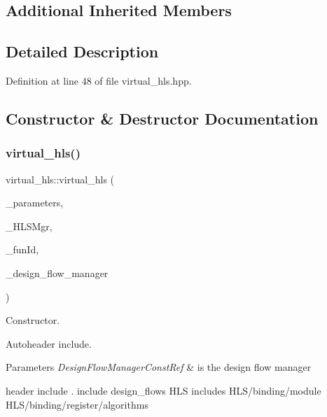 \subsection*{Additional Inherited Members}


\subsection{Detailed Description}


Definition at line 48 of file virtual\+\_\+hls.\+hpp.



\subsection{Constructor \& Destructor Documentation}
\mbox{\label{classvirtual__hls_a59f21603b7d72db8864ccf8f504096cc}} 
\subsubsection{\texorpdfstring{virtual\+\_\+hls()}{virtual\_hls()}}
{\footnotesize\ttfamily virtual\+\_\+hls\+::virtual\+\_\+hls (\begin{DoxyParamCaption}\item[{const \hyperlink{Parameter_8hpp_a37841774a6fcb479b597fdf8955eb4ea}{Parameter\+Const\+Ref}}]{\+\_\+parameters,  }\item[{const \hyperlink{hls__manager_8hpp_acd3842b8589fe52c08fc0b2fcc813bfe}{H\+L\+S\+\_\+manager\+Ref}}]{\+\_\+\+H\+L\+S\+Mgr,  }\item[{unsigned int}]{\+\_\+fun\+Id,  }\item[{const Design\+Flow\+Manager\+Const\+Ref}]{\+\_\+design\+\_\+flow\+\_\+manager }\end{DoxyParamCaption})}



Constructor. 

Autoheader include.


\begin{DoxyParams}{Parameters}
{\em Design\+Flow\+Manager\+Const\+Ref} & is the design flow manager\\
\hline
\end{DoxyParams}
header include . include design\+\_\+flows H\+LS includes H\+L\+S/binding/module H\+L\+S/binding/register/algorithms 

